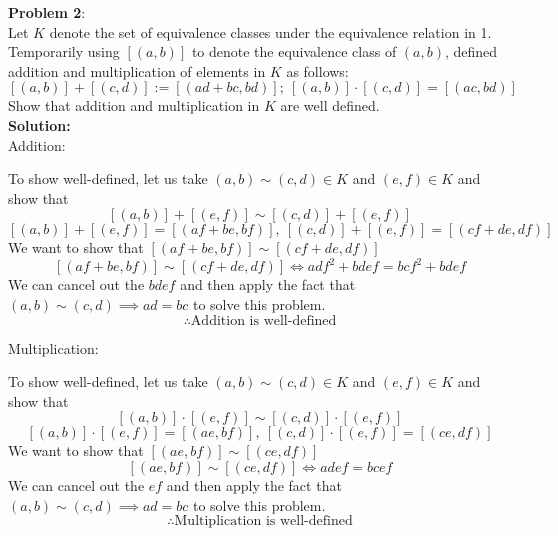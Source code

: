 \documentclass[11pt]{article}
\newcommand{\prob}[3]{\begin{flushleft}
        \textbf{Problem #1}: \\
        #2 
		\textbf{Solution:} 
		#3

\end{flushleft}}
\begin{document}
\prob{2}{
Let $K$ denote the set of equivalence classes under the equivalence relation in 1. Temporarily using $[(a,b)]$ to denote the equivalence class of $(a,b)$,
defined addition and multiplication of elements in $K$ as follows:
$$[(a,b)] + [(c,d)] := [(ad + bc, bd)]; \ [(a,b)] \cdot [(c,d)] = [(ac, bd)]$$
Show that addition and multiplication in $K$ are well defined. \\
}{ \\
Addition:

To show well-defined, let us take $(a,b) \sim (c,d) \in K$ and $(e,f) \in K$ and show that
$$[(a,b)] + [(e,f)] \sim [(c,d)] + [(e,f)]$$
$$[(a,b)] + [(e,f)] = [(af + be, bf)],\ [(c,d)] + [(e,f)] = [(cf + de, df)]$$
We want to show that $[(af + be, bf)] \sim [(cf + de, df)]$
$$[(af + be, bf)] \sim [(cf + de, df)] \iff adf^2 + bdef = bcf^2 + bdef$$
We can cancel out the $bdef$ and then apply the fact that $(a,b) \sim (c,d) \implies ad = bc$ to solve this problem.
$$\therefore \text{Addition is well-defined}$$

Multiplication:

To show well-defined, let us take $(a,b) \sim (c,d) \in K$ and $(e,f) \in K$ and show that
$$[(a,b)] \cdot [(e,f)] \sim [(c,d)] \cdot [(e,f)]$$
$$[(a,b)] \cdot [(e,f)] = [(ae, bf)],\ [(c,d)] \cdot [(e,f)] = [(ce, df)]$$
We want to show that $[(ae, bf)] \sim [(ce, df)]$
$$[(ae, bf)] \sim [(ce, df)] \iff adef = bcef$$
We can cancel out the $ef$ and then apply the fact that $(a,b) \sim (c,d) \implies ad = bc$ to solve this problem.
$$\therefore \text{Multiplication is well-defined}$$
}
\end{document}
